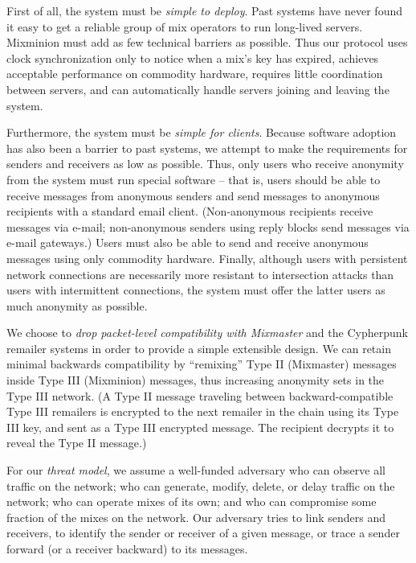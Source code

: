 \documentclass[times,10pt,twocolumn]{article}
\begin{document}
First of all, the system must be \emph{simple to deploy}. 
Past systems have never found it easy to get a reliable group of mix
operators to run long-lived servers. Mixminion must add as few
technical barriers as possible.  Thus our protocol uses clock
synchronization only to notice when a mix's key has expired, achieves
acceptable performance on commodity hardware, requires little
coordination between servers, and can automatically handle servers
joining and leaving the system.

Furthermore, the system must be \emph{simple for clients}.
Because software adoption has also been a barrier to past
systems, we attempt to make the requirements for senders and receivers as low
as possible. Thus, only users who receive anonymity from the system must run
special software -- that is, users should be able to receive messages
from anonymous senders and send messages to anonymous recipients with a
standard email client.  (Non-anonymous recipients receive messages via
e-mail; non-anonymous senders using reply blocks send messages via e-mail gateways.)
Users must also be able to send and receive anonymous messages
using only commodity hardware. Finally, although users with persistent
network connections are necessarily more resistant to intersection
attacks than users with intermittent connections, the system must offer
the latter users as much anonymity as possible.


We choose to \emph{drop packet-level compatibility with Mixmaster} and the
Cypherpunk remailer systems in order to provide a simple extensible
design. We can retain minimal backwards compatibility by ``remixing'' Type II
(Mixmaster) messages inside Type III (Mixminion) messages, thus increasing
anonymity sets in the Type III network. (A Type II message traveling between
backward-compatible Type III remailers is encrypted to
the next remailer in the chain using its Type III key, and sent as a Type III
encrypted message.  The recipient decrypts it to reveal the Type II
message.)

For our \emph{threat model}, we assume a well-funded adversary who can 
observe all traffic on the
network; who can generate, modify, delete, or delay traffic on the
network; who can operate mixes of its own; and who can compromise some
fraction of the mixes on the network. Our adversary tries to
link senders and receivers, to identify the sender or
receiver of a given message, or trace a sender forward (or a receiver
backward) to its messages.
\end{document}
